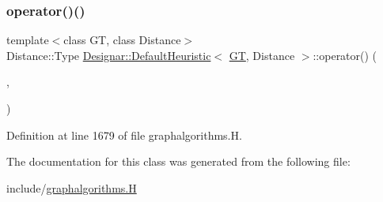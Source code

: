 \subsubsection{\texorpdfstring{operator()()}{operator()()}}
{\footnotesize\ttfamily template$<$class GT, class Distance$>$ \\
Distance\+::\+Type \hyperlink{class_designar_1_1_default_heuristic}{Designar\+::\+Default\+Heuristic}$<$ \hyperlink{demo-buildgraph_8_c_a3001c40d2c31ca87ed96cd7d1334a55e}{GT}, Distance $>$\+::operator() (\begin{DoxyParamCaption}\item[{typename \hyperlink{test-mtreenode_8_c_a17a24b0725f59987143c5faf63c4dc6f}{G\+T\+::\+Node} \&}]{,  }\item[{typename \hyperlink{test-mtreenode_8_c_a17a24b0725f59987143c5faf63c4dc6f}{G\+T\+::\+Node} \&}]{ }\end{DoxyParamCaption})\hspace{0.3cm}{\ttfamily [inline]}}



Definition at line 1679 of file graphalgorithms.\+H.



The documentation for this class was generated from the following file\+:\begin{DoxyCompactItemize}
\item 
include/\hyperlink{graphalgorithms_8_h}{graphalgorithms.\+H}\end{DoxyCompactItemize}

